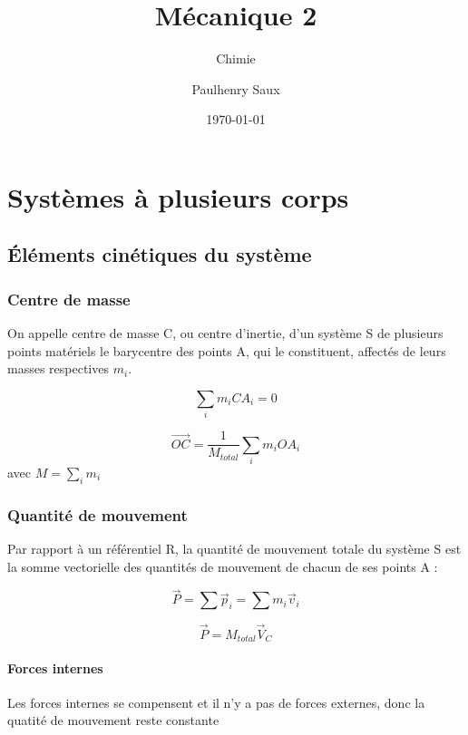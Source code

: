 \documentclass[french]{yLectureNote}
\title{Mécanique 2}
\subtitle{Chimie}
\author{Paulhenry Saux}
\date{\today}
\renewcommand{\vec}{\overrightarrow}
\newcommand{\dd}{\mathrm{d}}
\begin{document}
\setcounter{chapter}{3}
\chapter{Systèmes à plusieurs corps}
\section{Éléments cinétiques du système}
\subsection{Centre de masse}
On appelle centre de masse C, ou centre d'inertie, d'un système S de plusieurs points matériels le barycentre des points A, qui le constituent, affectés de leurs masses respectives \(m_i\).
\begin{proposition}
\[\sum_i m_iCA_i = 0\]
\end{proposition}
\begin{theorem}
 \[\vec{OC} = \frac{1}{M_{total}}\sum_i m_i OA_i\] avec \(M = \sum_i m_i\)
\end{theorem}
\subsection{Quantité de mouvement}
Par rapport à un référentiel R, la quantité de mouvement totale du système S est la somme vectorielle des quantités de mouvement de chacun de ses points A :
\begin{theorem}
 \[\vec{P} = \sum\vec{p}_i = \sum m_i \vec{v}_i\]
\end{theorem}
\begin{proposition}
\[\vec{P} = M_{total}\vec{V}_C\]
\end{proposition}
\subsubsection{Forces internes}
\begin{proposition}
Les forces internes se compensent et il n'y a pas de forces externes, donc la quatité de mouvement reste constante
\end{proposition}
\end{document}
